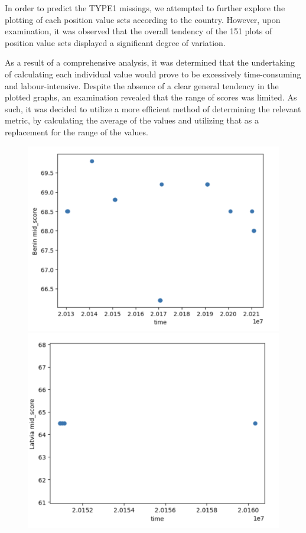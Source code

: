 \documentclass[8pt]{article}
\begin{document}
In order to predict the TYPE1 missings, we attempted to further explore the plotting of each position value sets according to the country. However, upon examination, it was observed that the overall tendency of the 151 plots of position value sets displayed a significant degree of variation.

As a result of a comprehensive analysis, it was determined that the undertaking of calculating each individual value would prove to be excessively time-consuming and labour-intensive. Despite the absence of a clear general tendency in the plotted graphs, an examination revealed that the range of scores was limited. As such, it was decided to utilize a more efficient method of determining the relevant metric, by calculating the average of the values and utilizing that as a replacement for the range of the values.
\begin{figure}[H]
    \centering
    \includegraphics[scale=.3]{ben_mid_values.png}
    \includegraphics[scale=.3]{lat_mid_values.png}

\end{figure}
\end{document}
